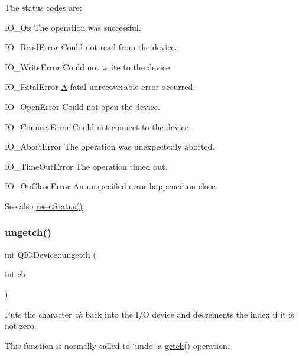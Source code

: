 The status codes are\+: 
\begin{DoxyItemize}
\item {\ttfamily I\+O\+\_\+\+Ok} The operation was successful. 
\item {\ttfamily I\+O\+\_\+\+Read\+Error} Could not read from the device. 
\item {\ttfamily I\+O\+\_\+\+Write\+Error} Could not write to the device. 
\item {\ttfamily I\+O\+\_\+\+Fatal\+Error} \mbox{\hyperlink{class_a}{A}} fatal unrecoverable error occurred. 
\item {\ttfamily I\+O\+\_\+\+Open\+Error} Could not open the device. 
\item {\ttfamily I\+O\+\_\+\+Connect\+Error} Could not connect to the device. 
\item {\ttfamily I\+O\+\_\+\+Abort\+Error} The operation was unexpectedly aborted. 
\item {\ttfamily I\+O\+\_\+\+Time\+Out\+Error} The operation timed out. 
\item {\ttfamily I\+O\+\_\+\+On\+Close\+Error} An unspecified error happened on close. 
\end{DoxyItemize}

\begin{DoxySeeAlso}{See also}
\mbox{\hyperlink{class_q_i_o_device_a1cd60113e530d3202d6dadf12021374c}{reset\+Status()}} 
\end{DoxySeeAlso}
\mbox{\label{class_q_i_o_device_aae3d67422103e8fc0411297b1d62c29a}} 
\subsubsection{\texorpdfstring{ungetch()}{ungetch()}}
{\footnotesize\ttfamily int Q\+I\+O\+Device\+::ungetch (\begin{DoxyParamCaption}\item[{int}]{ch }\end{DoxyParamCaption})\hspace{0.3cm}{\ttfamily [pure virtual]}}

Puts the character {\itshape ch} back into the I/O device and decrements the index if it is not zero.

This function is normally called to \char`\"{}undo\char`\"{} a \mbox{\hyperlink{class_q_i_o_device_a7cef61d66023f9cda6b0912082bd19fc}{getch()}} operation.


